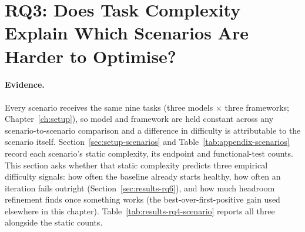 \section{RQ3: Does Task Complexity Explain Which Scenarios Are Harder to Optimise?}
\label{sec:results-rq4}

\begin{table}[H]
  \centering
  \caption{Per-scenario difficulty signals, pooled over each scenario's
    nine tasks (three models $\times$ three frameworks). Endpoints and
    functional tests (FTs) are the static counts of
    Table~\ref{tab:appendix-scenarios}. Failures are all recorded
    iteration-level failures for that scenario
    (Section~\ref{sec:results-rq6}); zero-end is the number of tasks whose
    final iteration reports zero goodput; median gain is the median
    best-over-first-positive-goodput ratio ($n=8$ for the two scenarios
    with a task that never records positive goodput, $n=9$ otherwise).}
  \label{tab:results-rq4-scenario}
  \small
\end{table}

\paragraph{Evidence.}
Every scenario receives the same nine tasks (three models $\times$ three
frameworks; Chapter~\ref{ch:setup}), so model and framework are held
constant across any scenario-to-scenario comparison and a difference in
difficulty is attributable to the scenario itself.
Section~\ref{sec:setup-scenarios} and
Table~\ref{tab:appendix-scenarios} record each scenario's static
complexity, its endpoint and functional-test counts. This section asks
whether that static complexity predicts three empirical difficulty
signals: how often the baseline already starts healthy, how often an
iteration fails outright (Section~\ref{sec:results-rq6}), and how much
headroom refinement finds once something works (the
best-over-first-positive gain used elsewhere in this chapter).
Table~\ref{tab:results-rq4-scenario} reports all three alongside the
static counts.

